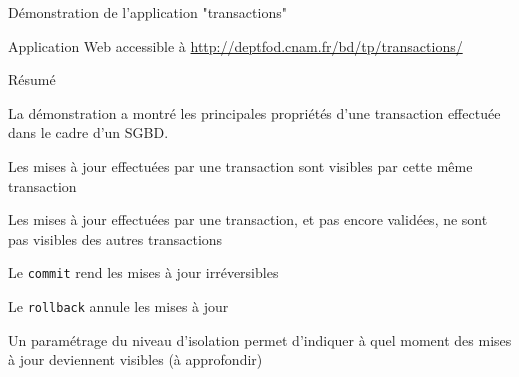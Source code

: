 
\begin{frame}[fragile]{Démonstration de l'application "transactions"}



\vfill

\begin{blocgauche}
Application Web accessible à \url{http://deptfod.cnam.fr/bd/tp/transactions/}
\end{blocgauche}


\end{frame}



\begin{frame}{Résumé}

La démonstration a montré les principales propriétés d'une transaction effectuée dans
le cadre d'un SGBD.

\vfill 

\vfill
\begin{blocgauche}
\begin{redbullet}
  \item Les mises à jour effectuées par une transaction sont visibles par cette même transaction
  \item Les mises à jour effectuées par une transaction, et pas encore validées, ne sont pas visibles des autres transactions
   \item Le \texttt{commit} rend les mises à jour irréversibles
  \item  Le \texttt{rollback} annule  les mises à jour
   \item Un paramétrage du niveau d'isolation permet d'indiquer à quel moment des mises à jour deviennent visibles (à approfondir)
\end{redbullet}
\end{blocgauche}

\end{frame}
